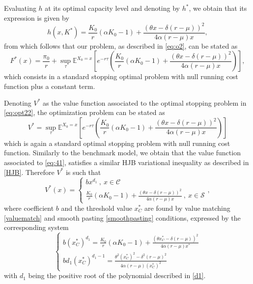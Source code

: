 Evaluating $h$ at its optimal capacity level and denoting by $h^*$, we obtain that its expression is given by
\begin{equation}
h(x,K^*)=\frac{K_0}{r}(\alpha K_0  -1) + \frac{(\theta x -\delta (r-\mu))^2}{4 \alpha (r-\mu) x}
,
\label{2_h*} 
\end{equation}
from which follows that our problem, as described in \eqref{eq:o2}, can be stated as
\begin{equation}
F^*(x)=\frac{\pi_0}{r}+ \sup _\tau \mathds{E}^{X_0=x} \left[ e^{-r\tau}   \left( \frac{K_0}{r}(\alpha K_0-1) + \frac{(\theta x -\delta (r-\mu))^2}{4 \alpha (r-\mu) x} \right) \right],
\label{eq:opt22}
\end{equation}
which consists in a standard stopping optimal problem with null running cost function plus a constant term.


Denoting $V^*$ as the value function associated to the optimal stopping problem in \eqref{eq:opt22}, the optimization problem can be stated as
\begin{equation}
V^*=\sup _\tau \mathds{E}^{X_0=x} \left[ e^{-r\tau}   \left( \frac{K_0}{r}(\alpha K_0-1) + \frac{(\theta x -\delta (r-\mu))^2}{4 \alpha (r-\mu) x} \right) \right]
\label{2_V*}
\end{equation}
which is again a standard optimal stopping problem with null running cost function. Similarly to the benchmark model, we obtain that the value function associated to \eqref{eq:41}, satisfies a similar HJB variational inequality as described in \eqref{HJB}. Therefore $V^*$ is such that
\begin{equation}
V^*(x)=\begin{cases} b x^{d_1}  \ , \ x \in \mathcal{C} \\
\frac{K_0}{r}(\alpha K_0-1) + \frac{(\theta x -\delta (r-\mu))^2}{4 \alpha (r-\mu) x} \ , \ x \in \mathcal{S}
\end{cases},
\label{2_V*2}
\end{equation}
where coefficient $b$ and the threshold value $x_C^*$ are found by value matching \eqref{valuematch} and smooth pasting \eqref{smoothpasting} conditions, expressed by the corresponding system
\begin{equation}
\begin{cases} b (x_C^*)^{d_1}=\frac{K_0}{r}(\alpha K_0-1) + \frac{(\theta x_C^* -\delta (r-\mu))^2}{4 \alpha (r-\mu) x^*}\\
b d_1(x_C^*)^{d_1-1}=\frac{\theta^2 (x_C^*)^2 -\delta^2 (r-\mu)^2}{4 \alpha (r-\mu) (x_C^*)^2}
\end{cases}
\label{eq:2_sistema}
\end{equation}
with $d_1$ being the positive root of the polynomial described in \eqref{d1}.

